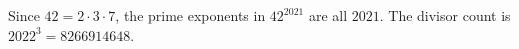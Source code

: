 Since $42=2\cdot3\cdot7$, the prime exponents in $42^{2021}$ are all $2021$. The divisor count is $\boxed{2022^3=8266914648}$.
